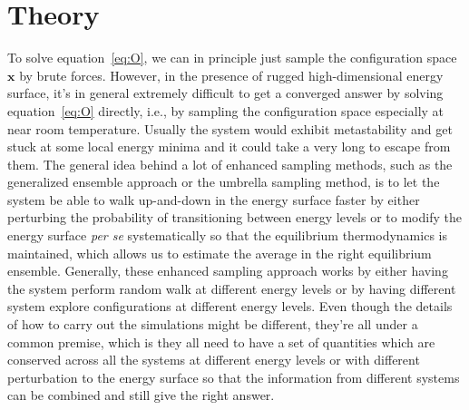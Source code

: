 \section{Theory}\label{sec:theory} 
To solve equation~\ref{eq:O}, we can in principle just sample the 
configuration space $\mathbf{x}$ by brute forces. However, in the 
presence of rugged high-dimensional energy surface, it's in general
extremely difficult to get a converged answer by solving equation~\ref{eq:O} directly, 
i.e., by sampling the configuration space especially at near room temperature.
Usually the system would exhibit metastability and get stuck at some local
energy minima and it could take a very long to escape from them. The general
idea behind a lot of enhanced sampling methods, such as the generalized 
ensemble approach or the umbrella sampling method, is to let the system 
be able to walk up-and-down in the energy surface faster by either
perturbing the probability of transitioning between energy levels or to 
modify the energy surface \textit{per se} systematically so that the 
equilibrium thermodynamics is maintained, which allows us to estimate
the average in the right equilibrium ensemble. Generally, these enhanced 
sampling approach works by either having the system perform random walk 
at different energy levels or by having different system explore configurations
at different energy levels. Even though the details of how to carry out 
the simulations might be different, they're all under a common premise, 
which is they all need to have a set of quantities which are conserved 
across all the systems at different energy levels or with different 
perturbation to the energy surface so that the information from different 
systems can be combined and still give the right answer.

